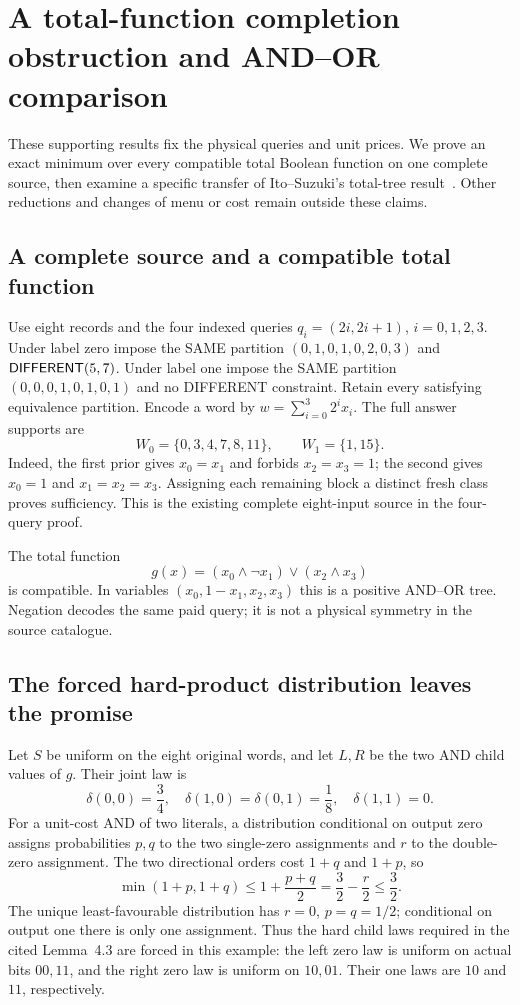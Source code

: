 \section{A total-function completion obstruction and AND--OR comparison}
\label{app:andor-transfer}
These supporting results fix the physical queries and unit prices. We
prove an exact minimum over every compatible total Boolean function on
one complete source, then examine a specific transfer of Ito--Suzuki's
total-tree result~\cite{itosuzuki2025collapse}. Other reductions and
changes of menu or cost remain outside these claims.

\subsection{A complete source and a compatible total function}
Use eight records and the four indexed queries
$q_i=(2i,2i+1)$, $i=0,1,2,3$. Under label zero impose the SAME partition
$(0,1,0,1,0,2,0,3)$ and $\mathsf{DIFFERENT}(5,7)$. Under label one impose the SAME
partition $(0,0,0,1,0,1,0,1)$ and no DIFFERENT constraint.
Retain every satisfying equivalence partition. Encode a word by
$w=\sum_{i=0}^{3}2^i x_i$. The full answer supports are
\[
 W_0=\{0,3,4,7,8,11\},\qquad W_1=\{1,15\}.
\]
Indeed, the first prior gives $x_0=x_1$ and forbids $x_2=x_3=1$;
the second gives $x_0=1$ and $x_1=x_2=x_3$. Assigning each remaining
block a distinct fresh class proves sufficiency. This is the existing complete eight-input source in the four-query proof.

The total function
\[
 g(x)=(x_0\wedge\neg x_1)\vee(x_2\wedge x_3)
\]
is compatible. In variables $(x_0,1-x_1,x_2,x_3)$ this is a positive AND--OR tree.
Negation decodes the same paid query; it is not a physical symmetry in
the source catalogue.

\subsection{The forced hard-product distribution leaves the promise}
Let $S$ be uniform on the eight original words, and let $L,R$ be the two
AND child values of $g$. Their joint law is
\[
 \delta(0,0)=\frac34,\quad
 \delta(1,0)=\delta(0,1)=\frac18,\quad\delta(1,1)=0.
\]
For a unit-cost AND of two literals, a distribution conditional on
output zero assigns probabilities $p,q$ to the two single-zero assignments
and $r$ to the double-zero assignment. The two directional orders cost
$1+q$ and $1+p$, so
\[
 \min(1+p,1+q)\le 1+\frac{p+q}{2}
      =\frac32-\frac r2\le\frac32.
\]
The unique least-favourable distribution has $r=0$, $p=q=1/2$;
conditional on output one there is only one assignment. Thus the hard
child laws required in the cited Lemma~4.3 are forced in this example:
the left zero law is uniform on actual bits $00,11$, and the right
zero law is uniform on $10,01$. Their one laws are $10$ and $11$,
respectively.

